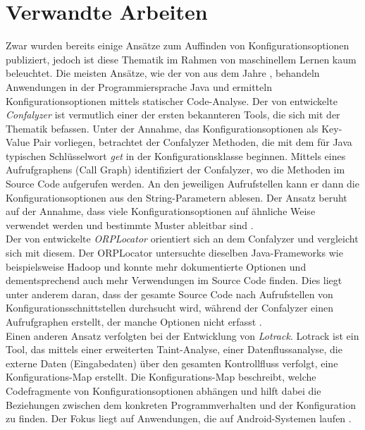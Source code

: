 \documentclass[german,bachelor]{swsLeipzig}
\begin{document}
\chapter{Verwandte Arbeiten}\label{Verwandte Arbeiten}
Zwar wurden bereits einige Ansätze zum Auffinden von Konfigurationsoptionen publiziert, jedoch ist diese Thematik im Rahmen von
maschinellem Lernen kaum beleuchtet.
Die meisten Ansätze, wie der von \citeauthor{10.1145/1985793.1985812} aus dem Jahre \citeyear{10.1145/1985793.1985812},
behandeln Anwendungen in der Programmiersprache Java und ermitteln Konfigurationsoptionen mittels statischer Code-Analyse.
Der von \citeauthor{10.1145/1985793.1985812} entwickelte \textit{Confalyzer} ist vermutlich einer der ersten bekannteren
Tools, die sich mit der Thematik befassen.
Unter der Annahme, das Konfigurationsoptionen als Key-Value Pair vorliegen, betrachtet der Confalyzer Methoden, die mit
dem für Java typischen Schlüsselwort \textit{get} in der Konfigurationsklasse beginnen.
Mittels eines Aufrufgraphens (Call Graph) identifiziert der Confalyzer, wo die Methoden im Source Code aufgerufen werden.
An den jeweiligen Aufrufstellen kann er dann die Konfigurationsoptionen aus den String-Parametern ablesen.
Der Ansatz beruht auf der Annahme, dass viele Konfigurationsoptionen auf ähnliche Weise verwendet werden und bestimmte
Muster ableitbar sind \cite[]{10.1145/1985793.1985812}.\\
\indent Der von \citeauthor{7774519} entwickelte \textit{ORPLocator} orientiert sich an dem Confalyzer und vergleicht sich mit diesem.
Der ORPLocator untersuchte dieselben Java-Frameworks wie beispielsweise Hadoop und konnte mehr dokumentierte
Optionen und dementsprechend auch mehr Verwendungen im Source Code finden.
Dies liegt unter anderem daran, dass der gesamte Source Code nach Aufrufstellen von Konfigurationsschnittstellen durchsucht wird,
während der Confalyzer einen Aufrufgraphen erstellt, der manche Optionen nicht erfasst \cite[]{7774519}.\\
\indent Einen anderen Ansatz verfolgten \citeauthor{8049300} bei der Entwicklung von \textit{Lotrack}.
Lotrack ist ein Tool, das mittels einer erweiterten Taint-Analyse, einer Datenflussanalyse, die externe Daten
(Eingabedaten) über den gesamten Kontrollfluss verfolgt, eine Konfigurations-Map erstellt.
Die Konfigurations-Map beschreibt, welche Codefragmente von Konfigurationsoptionen abhängen und hilft dabei die
Beziehungen zwischen dem konkreten Programmverhalten und der Konfiguration zu finden.
Der Fokus liegt auf Anwendungen, die auf Android-Systemen laufen \cite[]{8049300}. \\
\end{document}

